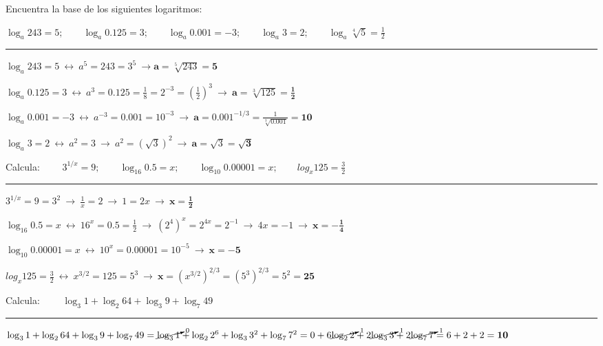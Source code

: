 \begin{miejercicio}

Encuentra la base de los siguientes logaritmos:

\vspace{2mm} $\log_a 243=5;\qquad \log_a 0.125=3;\qquad \log_a 0.001=-3;\qquad \log_a 3=2;\qquad \log_a \sqrt[4]{5}=\frac 1 2 $	

\rule{300pt}{0.1pt}

$\log_a 243=5 \ \leftrightarrow \ a^5=243=3^5 \ \to \boldsymbol{ a}= \sqrt[5]{243} =\boldsymbol{ 5}$

\vspace{2mm} $\log_a 0.125=3 \ \leftrightarrow \ a^3=0.125=\frac 1 8 =2^{-3}=\left( \frac 1 2 \right)^3 \ \to \ \boldsymbol{a}=\sqrt[3]{125}=\boldsymbol{ \frac 1 2}$

\vspace{2mm} $\log_a 0.001=-3 \ \leftrightarrow \ a^{-3}=0.001=10^{-3} \ \to \ \boldsymbol{a}= 0.001^{-1/3}= \frac 1 {\sqrt[3]{0.001}}=\boldsymbol {10}$

\vspace{2mm} $\log_a 3=2 \ \leftrightarrow \ a^2=3 \ \to \ a^2=(\sqrt{3})^2 \ \to \ \boldsymbol{a}=\sqrt{3} =\boldsymbol{\sqrt{3}}$
\end{miejercicio}

\begin{miejercicio}

Calcula: $\qquad 3^{1/x}=9;\qquad \log_{16}0.5=x;\qquad \log_{10}0.00001=x;\qquad log_x 125=\frac 32$	


\rule{300pt}{0.1pt}

$3^{1/x}=9=3^2 \ \to \ \frac 1 x = 2 \ \to \ 1=2x \ \to \ \boldsymbol{x=\frac 1 2} $

\vspace{2mm} $\log_{16}0.5=x \ \leftrightarrow \ 16^x=0.5=\frac 1 2 \ \to \ (2^4)^x=2^{4x}=2^{-1} \ \to \ 4x=-1 \ \to \ \boldsymbol{x=-\frac 1 4}$

\vspace{2mm} $\log_{10}0.00001=x \ \leftrightarrow \ 10^x=0.00001=10^{-5} \ \to \ \boldsymbol{x=-5}$

\vspace{2mm} $log_x 125=\frac 32 \ \leftrightarrow \ x^{3/2}=125=5^3 \ \to \ \boldsymbol{x}=(x^{3/2})^{2/3}=(5^3)^{2/3}=5^2=\boldsymbol{25}$	
 \end{miejercicio}
 


\begin{miejercicio}

Calcula: $\qquad \log_3 1 +\log_2 64 +\log_3 9 + \log_7 49$	


\rule{300pt}{0.1pt}

$\log_3 1 +\log_2 64 +\log_3 9 + \log_7 49=\cancelto{0}{\log_3 1} +\log_2 2^6 +\log_3 3^2 + \log_7 7^2=0 +6 \cancelto{1}{\log_2 2} +2 \cancelto{1}{\log_3 3} + 2 \cancelto{1}{\log_7 7}=6+2+2=\boldsymbol{ 10}$

\end{miejercicio}


